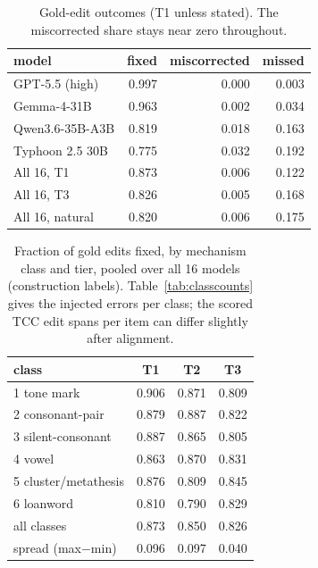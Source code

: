 \documentclass[11pt]{article}
\begin{document}
\begin{table}[t]
\centering\small\setlength{\tabcolsep}{4pt}
\begin{tabular}{@{}lrrr@{}}
\toprule
model & fixed & miscorrected & missed \\
\midrule
GPT-5.5 (high)   & 0.997 & 0.000 & 0.003 \\
Gemma-4-31B      & 0.963 & 0.002 & 0.034 \\
Qwen3.6-35B-A3B  & 0.819 & 0.018 & 0.163 \\
Typhoon 2.5 30B  & 0.775 & 0.032 & 0.192 \\
\midrule
All 16, T1       & 0.873 & 0.006 & 0.122 \\
All 16, T3       & 0.826 & 0.005 & 0.168 \\
All 16, natural  & 0.820 & 0.006 & 0.175 \\
\bottomrule
\end{tabular}
\caption{Gold-edit outcomes (T1 unless stated). The miscorrected share stays near zero
throughout.}
\label{tab:decomp}
\end{table}

\begin{table}[t]
\centering\small\setlength{\tabcolsep}{4pt}
\begin{tabular}{@{}lccc@{}}
\toprule
class & T1 & T2 & T3 \\
\midrule
1 tone mark          & 0.906 & 0.871 & 0.809 \\
2 consonant-pair     & 0.879 & 0.887 & 0.822 \\
3 silent-consonant   & 0.887 & 0.865 & 0.805 \\
4 vowel              & 0.863 & 0.870 & 0.831 \\
5 cluster/metathesis & 0.876 & 0.809 & 0.845 \\
6 loanword           & 0.810 & 0.790 & 0.829 \\
\midrule
all classes          & 0.873 & 0.850 & 0.826 \\
spread (max$-$min)   & 0.096 & 0.097 & 0.040 \\
\bottomrule
\end{tabular}
\caption{Fraction of gold edits fixed, by mechanism class and tier, pooled over all 16 models
(construction labels). Table~\ref{tab:classcounts} gives the injected errors per class; the
scored TCC edit spans per item can differ slightly after alignment.}
\label{tab:mech}
\end{table}
\end{document}
